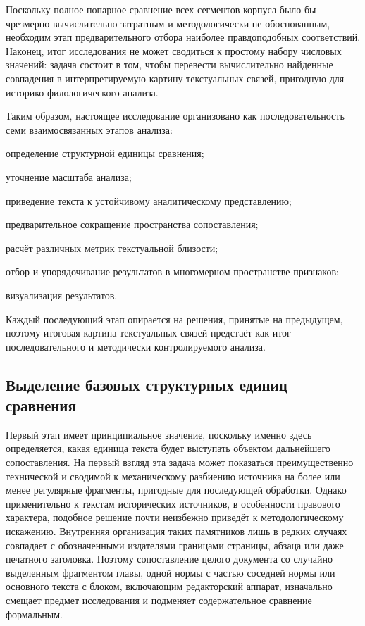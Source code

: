 Поскольку полное попарное сравнение всех сегментов корпуса было бы чрезмерно вычислительно затратным и методологически не обоснованным, необходим этап предварительного отбора наиболее правдоподобных соответствий. Наконец, итог исследования не может сводиться к простому набору числовых значений: задача состоит в том, чтобы перевести вычислительно найденные совпадения в интерпретируемую картину текстуальных связей, пригодную для историко-филологического анализа.

Таким образом, настоящее исследование организовано как последовательность семи взаимосвязанных этапов анализа:

определение структурной единицы сравнения;

уточнение масштаба анализа;

приведение текста к устойчивому аналитическому представлению;

предварительное сокращение пространства сопоставления;

расчёт различных метрик текстуальной близости;

отбор и упорядочивание результатов в многомерном пространстве признаков;

визуализация результатов.

Каждый последующий этап опирается на решения, принятые на предыдущем, поэтому итоговая картина текстуальных связей предстаёт как итог последовательного и методически контролируемого анализа.

\subsection{Выделение базовых структурных единиц сравнения}

Первый этап имеет принципиальное значение, поскольку именно здесь определяется, какая единица текста будет выступать объектом дальнейшего сопоставления. На первый взгляд эта задача может показаться преимущественно технической и сводимой к механическому разбиению источника на более или менее регулярные фрагменты, пригодные для последующей обработки. Однако применительно к текстам исторических источников, в особенности правового характера, подобное решение почти неизбежно приведёт к методологическому искажению. Внутренняя организация таких памятников лишь в редких случаях совпадает с обозначенными издателями границами страницы, абзаца или даже печатного заголовка. Поэтому сопоставление целого документа со случайно выделенным фрагментом главы, одной нормы с частью соседней нормы или основного текста с блоком, включающим редакторский аппарат, изначально смещает предмет исследования и подменяет содержательное сравнение формальным.

